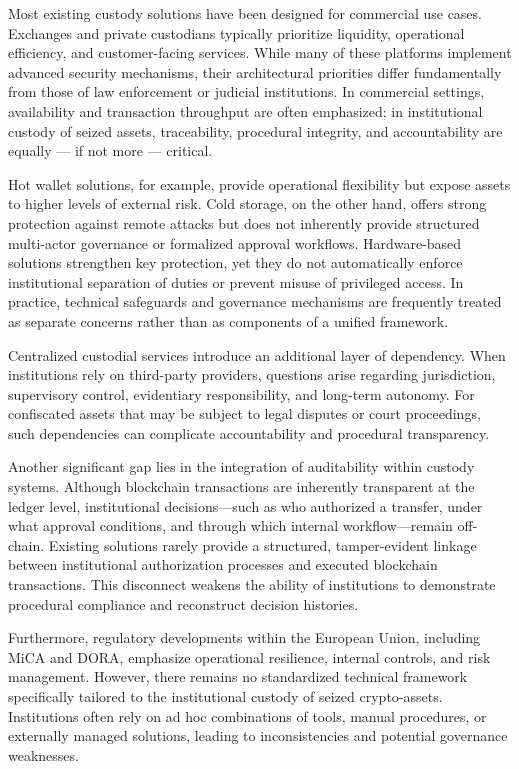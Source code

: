 \documentclass[12pt,a4paper]{report}
\begin{document}
Most existing custody solutions have been designed for commercial use cases. Exchanges and private custodians typically prioritize liquidity, operational efficiency, and customer-facing services. While many of these platforms implement advanced security mechanisms, their architectural priorities differ fundamentally from those of law enforcement or judicial institutions. In commercial settings, availability and transaction throughput are often emphasized; in institutional custody of seized assets, traceability, procedural integrity, and accountability are equally — if not more — critical.

Hot wallet solutions, for example, provide operational flexibility but expose assets to higher levels of external risk. Cold storage, on the other hand, offers strong protection against remote attacks but does not inherently provide structured multi-actor governance or formalized approval workflows. Hardware-based solutions strengthen key protection, yet they do not automatically enforce institutional separation of duties or prevent misuse of privileged access. In practice, technical safeguards and governance mechanisms are frequently treated as separate concerns rather than as components of a unified framework.

Centralized custodial services introduce an additional layer of dependency. When institutions rely on third-party providers, questions arise regarding jurisdiction, supervisory control, evidentiary responsibility, and long-term autonomy. For confiscated assets that may be subject to legal disputes or court proceedings, such dependencies can complicate accountability and procedural transparency.

Another significant gap lies in the integration of auditability within custody systems. Although blockchain transactions are inherently transparent at the ledger level, institutional decisions—such as who authorized a transfer, under what approval conditions, and through which internal workflow—remain off-chain. Existing solutions rarely provide a structured, tamper-evident linkage between institutional authorization processes and executed blockchain transactions. This disconnect weakens the ability of institutions to demonstrate procedural compliance and reconstruct decision histories.

Furthermore, regulatory developments within the European Union, including MiCA and DORA, emphasize operational resilience, internal controls, and risk management. However, there remains no standardized technical framework specifically tailored to the institutional custody of seized crypto-assets. Institutions often rely on ad hoc combinations of tools, manual procedures, or externally managed solutions, leading to inconsistencies and potential governance weaknesses.
\end{document}

